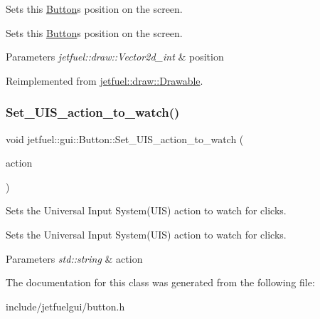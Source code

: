 Sets this \hyperlink{classjetfuel_1_1gui_1_1Button}{Button}\textquotesingle{}s position on the screen. 

Sets this \hyperlink{classjetfuel_1_1gui_1_1Button}{Button}\textquotesingle{}s position on the screen.


\begin{DoxyParams}{Parameters}
{\em jetfuel\+::draw\+::\+Vector2d\+\_\+int} & position \\
\hline
\end{DoxyParams}


Reimplemented from \hyperlink{classjetfuel_1_1draw_1_1Drawable_afdd035afe40c706459a6c9df813bcce6}{jetfuel\+::draw\+::\+Drawable}.

\mbox{\label{classjetfuel_1_1gui_1_1Button_a174b285f6271813e83fe277402ea3b8b}} 
\subsubsection{\texorpdfstring{Set\+\_\+\+U\+I\+S\+\_\+action\+\_\+to\+\_\+watch()}{Set\_UIS\_action\_to\_watch()}}
{\footnotesize\ttfamily void jetfuel\+::gui\+::\+Button\+::\+Set\+\_\+\+U\+I\+S\+\_\+action\+\_\+to\+\_\+watch (\begin{DoxyParamCaption}\item[{const std\+::string}]{action }\end{DoxyParamCaption})\hspace{0.3cm}{\ttfamily [inline]}}



Sets the Universal Input System(\+U\+I\+S) action to watch for clicks. 

Sets the Universal Input System(\+U\+I\+S) action to watch for clicks.


\begin{DoxyParams}{Parameters}
{\em std\+::string} & action \\
\hline
\end{DoxyParams}


The documentation for this class was generated from the following file\+:\begin{DoxyCompactItemize}
\item 
include/jetfuelgui/button.\+h\end{DoxyCompactItemize}
